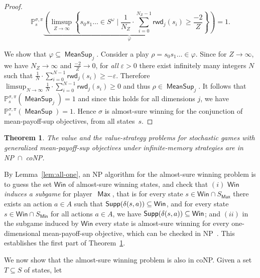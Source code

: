 \documentclass{article}
\newtheorem{theorem}{Theorem}
\let\epsilon\varepsilon
\newcommand{\Supp}{{\sf Supp}}
\newcommand{\PP}{\delta}
\newcommand{\Win}{\mathsf{Win}}
\newcommand{\straa}{\sigma}
\newcommand{\strab}{\pi}
\DeclareMathOperator{\ma}{\mathsf{Max}}
\DeclareMathOperator{\mi}{\mathsf{Min}}
\newcommand{\prob}[1]{\mathbb{P}_{#1}}
\newcommand{\rwd}{\mathsf{rwd}}
\newcommand{\MeanSup}{\operatorname{\mathsf{MeanSup}}}
\begin{document}
\begin{proof}
$$\prob{s}^{\straa,\strab} \underbrace{ \left( \limsup_{Z \to \infty} \left\{ s_0 s_1 \dots \in S^\omega \mid \frac{1}{N_{Z}} 
\cdot \sum_{i = 0}^{N_{Z}-1} \rwd_j(s_{i}) \geq \frac{-2}{Z} \right\} \right)}_{\varphi} = 1.$$

We show that $\varphi \subseteq \MeanSup_j$. Consider a play $\rho = s_0 s_1 \dots \in \varphi$.
Since for $Z \to \infty$, we have $N_Z \to \infty$ and $\frac{-2}{Z} \to 0$, 
for \emph{all} $\epsilon > 0$ there exist infinitely many integers $N$ such that 
$\frac{1}{N} \cdot \sum_{i = 0}^{N-1} \rwd_j(s_{i}) \geq -\epsilon$.
Therefore $\limsup_{N \to\infty} \frac{1}{N} \cdot \sum_{i = 0}^{N-1} \rwd_j(s_{i}) \geq 0$
and thus $\rho \in \MeanSup_j$. It follows that 
$\prob{s}^{\straa,\strab} \left( \MeanSup_j \right) = 1$ and since this holds 
for all dimensions $j$, we have $\prob{s}^{\straa,\strab} \left( \MeanSup \right) = 1$.
Hence $\straa$ is almost-sure winning for the conjunction of mean-payoff-sup 
objectives, from all states~$s$.
\end{proof}



\begin{theorem}\label{theo:mean-payoff-sup-infinite}
The value and the value-strategy problems for stochastic games 
with generalized mean-payoff-sup objectives under infinite-memory 
strategies are in NP~$\cap$~coNP.
\end{theorem}



\smallskip{}
By Lemma~\ref{lem:all-one}, an NP algorithm for the almost-sure winning
problem is to guess the set $\Win$ of almost-sure winning states, and check
that $(i)$ $\Win$ \emph{induces a subgame} for player~$\ma$, that is for every
state $s \in \Win \cap S_{\ma}$ there exists an action $a \in A$ such that
$\Supp(\PP(s,a)) \subseteq \Win$, and for every state $s \in \Win \cap S_{\mi}$ 
for all actions $a \in A$, we have $\Supp(\PP(s,a)) \subseteq \Win$;
and $(ii)$ in the subgame induced by $\Win$ every state is almost-sure winning
for every one-dimensional mean-payoff-sup objective, which can be checked in NP~\cite{LigLip69}.
This establishes the first part of Theorem~\ref{theo:mean-payoff-sup-infinite}.



\smallskip{}
We now show that the almost-sure winning problem is also in coNP. 
Given a set $T \subseteq S$ of states, let 
 
\end{document}
